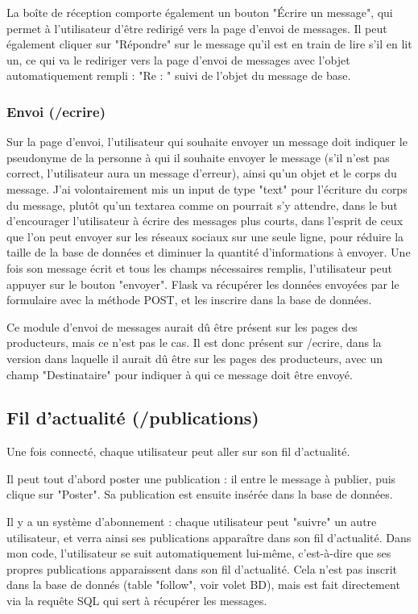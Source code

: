 \documentclass{article}
\begin{document}
La boîte de réception comporte également un bouton "Écrire un message", qui permet à l'utilisateur d'être redirigé vers la page d'envoi de messages. Il peut également cliquer sur "Répondre" sur le message qu'il est en train de lire s'il en lit un, ce qui va le rediriger vers la page d'envoi de messages avec l'objet automatiquement rempli : "Re : " suivi de l'objet du message de base.

\subsubsection{Envoi (/ecrire)}

Sur la page d'envoi, l'utilisateur qui souhaite envoyer un message doit indiquer le pseudonyme de la personne à qui il souhaite envoyer le message (s'il n'est pas correct, l'utilisateur aura un message d'erreur), ainsi qu'un objet et le corps du message. J'ai volontairement mis un input de type "text" pour l'écriture du corps du message, plutôt qu'un textarea comme on pourrait s'y attendre, dans le but d'encourager l'utilisateur à écrire des messages plus courts, dans l'esprit de ceux que l'on peut envoyer sur les réseaux sociaux sur une seule ligne, pour réduire la taille de la base de données et diminuer la quantité d'informations à envoyer. Une fois son message écrit et tous les champs nécessaires remplis, l'utilisateur peut appuyer sur le bouton "envoyer". Flask va récupérer les données envoyées par le formulaire avec la méthode POST, et les inscrire dans la base de données.

Ce module d'envoi de messages aurait dû être présent sur les pages des producteurs, mais ce n'est pas le cas. Il est donc présent sur /ecrire, dans la version dans laquelle il aurait dû être sur les pages des producteurs, avec un champ "Destinataire" pour indiquer à qui ce message doit être envoyé.

\subsection{Fil d'actualité (/publications)}

Une fois connecté, chaque utilisateur peut aller sur son fil d'actualité.

Il peut tout d'abord poster une publication : il entre le message à publier, puis clique sur "Poster". Sa publication est ensuite insérée dans la base de données.

Il y a un système d'abonnement : chaque utilisateur peut "suivre" un autre utilisateur, et verra ainsi ses publications apparaître dans son fil d'actualité. Dans mon code, l'utilisateur se suit automatiquement lui-même, c'est-à-dire que ses propres publications apparaissent dans son fil d'actualité. Cela n'est pas inscrit dans la base de donnés (table "follow", voir volet BD), mais est fait directement via la requête SQL qui sert à récupérer les messages.
\end{document}
